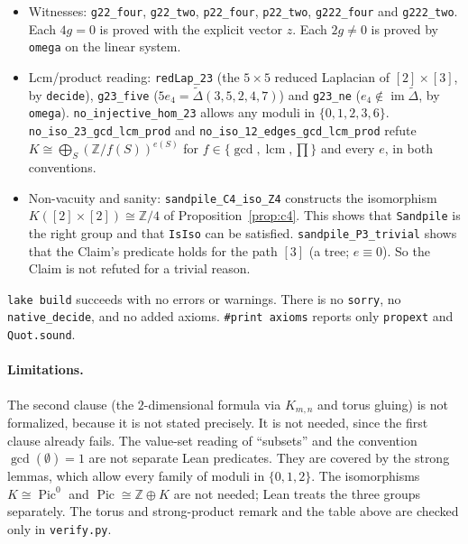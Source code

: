 \documentclass[11pt]{article}
\theoremstyle{definition}
\theoremstyle{remark}
\newcommand{\Z}{\mathbb{Z}}
\newcommand{\Pic}{\operatorname{Pic}}
\begin{document}
\begin{itemize}
\texttt{no\_iso\_22\_Pic0} and \texttt{no\_iso\_22\_Pic}. The strong forms
\texttt{no\_injective\_hom\_C4}, \texttt{\_Q3}, \texttt{\_PicC4} and
\texttt{\_Pic0C4} exclude injective additive maps into
$\prod_{i\in\iota}\Z/d_i$ for an arbitrary type $\iota$ and arbitrary
$d_i\in\{0,1,2\}$.
\item Witnesses: \texttt{g22\_four}, \texttt{g22\_two}, \texttt{p22\_four},
\texttt{p22\_two}, \texttt{g222\_four} and \texttt{g222\_two}. Each $4g=0$ is
proved with the explicit vector $z$. Each $2g\ne0$ is proved by
\texttt{omega} on the linear system.
\item Lcm/product reading: \texttt{redLap\_23} (the $5\times5$ reduced Laplacian of
$[2]\times[3]$, by \texttt{decide}), \texttt{g23\_five} ($5e_4=\tilde\Delta(3,5,2,4,7)$) and
\texttt{g23\_ne} ($e_4\notin\operatorname{im}\tilde\Delta$, by \texttt{omega}).
\texttt{no\_injective\_hom\_23} allows any moduli in $\{0,1,2,3,6\}$.
\texttt{no\_iso\_23\_gcd\_lcm\_prod} and \texttt{no\_iso\_12\_edges\_gcd\_lcm\_prod}
refute $K\cong\bigoplus_S(\Z/f(S))^{e(S)}$ for $f\in\{\gcd,\operatorname{lcm},\prod\}$
and every $e$, in both conventions.
\item Non-vacuity and sanity: \texttt{sandpile\_C4\_iso\_Z4} constructs the
isomorphism $K([2]\times[2])\cong\Z/4$ of Proposition~\ref{prop:c4}. This
shows that \texttt{Sandpile} is the right group and that \texttt{IsIso} can be
satisfied. \texttt{sandpile\_P3\_trivial} shows that the Claim's predicate
holds for the path $[3]$ (a tree; $e\equiv0$). So the Claim is not refuted
for a trivial reason.
\end{itemize}
\texttt{lake build} succeeds with no errors or warnings. There is no
\texttt{sorry}, no \texttt{native\_decide}, and no added axioms.
\texttt{\#print axioms} reports only \texttt{propext} and \texttt{Quot.sound}.

\paragraph{Limitations.} The second clause (the $2$-dimensional formula via
$K_{m,n}$ and torus gluing) is not formalized, because it is not stated
precisely. It is not needed, since the first clause already fails. The value-set reading of
``subsets'' and the convention $\gcd(\emptyset)=1$ are not separate Lean
predicates. They are covered by the strong lemmas, which allow every family of
moduli in $\{0,1,2\}$. The isomorphisms $K\cong\Pic^0$ and $\Pic\cong\Z\oplus K$
are not needed; Lean treats the three groups separately. The torus and strong-product
remark and the table above are checked only in \texttt{verify.py}.
\end{document}
